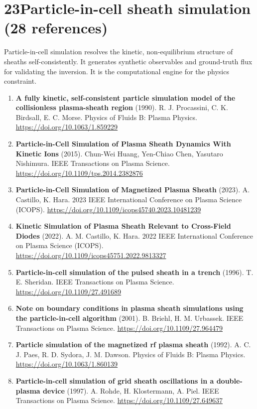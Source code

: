 \documentclass[11pt,a4paper]{article}
\begin{document}
\section*{23\quad Particle-in-cell sheath simulation \textnormal{(\normalsize 28 references)}}
Particle-in-cell simulation resolves the kinetic, non-equilibrium structure of sheaths self-consistently. It generates synthetic observables and ground-truth flux for validating the inversion. It is the computational engine for the physics constraint.
\begin{enumerate}[leftmargin=1.4em]
\item \textbf{A fully kinetic, self-consistent particle simulation model of the collisionless plasma-sheath region} (1990). R. J. Procassini, C. K. Birdsall, E. C. Morse. Physics of Fluids B: Plasma Physics. \url{https://doi.org/10.1063/1.859229}
\item \textbf{Particle-in-Cell Simulation of Plasma Sheath Dynamics With Kinetic Ions} (2015). Chun-Wei Huang, Yen-Chiao Chen, Yasutaro Nishimura. IEEE Transactions on Plasma Science. \url{https://doi.org/10.1109/tps.2014.2382876}
\item \textbf{Particle-in-Cell Simulation of Magnetized Plasma Sheath} (2023). A. Castillo, K. Hara. 2023 IEEE International Conference on Plasma Science (ICOPS). \url{https://doi.org/10.1109/icops45740.2023.10481239}
\item \textbf{Kinetic Simulation of Plasma Sheath Relevant to Cross-Field Diodes} (2022). A. M. Castillo, K. Hara. 2022 IEEE International Conference on Plasma Science (ICOPS). \url{https://doi.org/10.1109/icops45751.2022.9813327}
\item \textbf{Particle-in-cell simulation of the pulsed sheath in a trench} (1996). T. E. Sheridan. IEEE Transactions on Plasma Science. \url{https://doi.org/10.1109/27.491689}
\item \textbf{Note on boundary conditions in plasma sheath simulations using the particle-in-cell algorithm} (2001). B. Briehl, H. M. Urbassek. IEEE Transactions on Plasma Science. \url{https://doi.org/10.1109/27.964479}
\item \textbf{Particle simulation of the magnetized rf plasma sheath} (1992). A. C. J. Paes, R. D. Sydora, J. M. Dawson. Physics of Fluids B: Plasma Physics. \url{https://doi.org/10.1063/1.860139}
\item \textbf{Particle-in-cell simulation of grid sheath oscillations in a double-plasma device} (1997). A. Rohde, H. Klostermann, A. Piel. IEEE Transactions on Plasma Science. \url{https://doi.org/10.1109/27.649637}

\end{enumerate}
\end{document}
